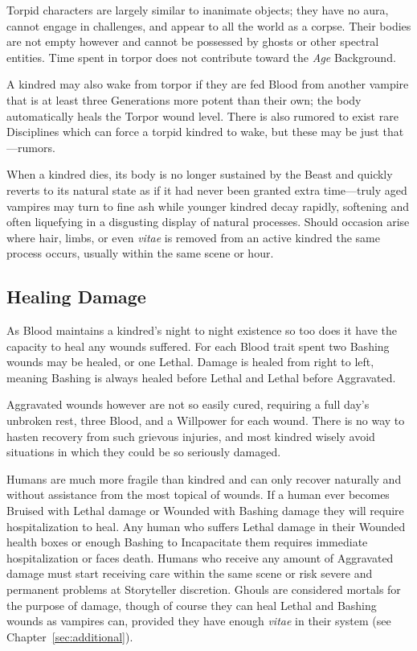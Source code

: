 Torpid characters are largely similar to inanimate objects; they have no aura, 
cannot engage in challenges, and appear to all the world as a corpse.  Their bodies 
are not empty however and cannot be possessed by ghosts or other spectral entities.  
Time spent in torpor does not contribute toward the \emph{Age} Background.

A kindred may also wake from torpor if they are fed Blood from another 
vampire that is at least three Generations more potent than their own; 
the body automatically heals the Torpor wound level.  There is also 
rumored to exist rare Disciplines which can force a torpid kindred to 
wake, but these may be just that---rumors.

When a kindred dies, its body is no longer sustained by the Beast and 
quickly reverts to its natural state as if it had never been granted 
extra time---truly aged vampires may turn to fine ash while younger 
kindred decay rapidly, softening and often liquefying in a disgusting 
display of natural processes.  Should occasion arise where hair, limbs, 
or even \emph{vitae} is removed from an active kindred the same process 
occurs, usually within the same scene or hour.

\subsection{Healing Damage}
As Blood maintains a kindred's night to night existence so too does it 
have the capacity to heal any wounds suffered.  For each Blood trait 
spent two Bashing wounds may be healed, or one Lethal.  Damage is healed 
from right to left, meaning Bashing is always healed before Lethal and 
Lethal before Aggravated.

Aggravated wounds however are not so easily cured, requiring a full 
day's unbroken rest, three Blood, and a Willpower for each wound.  
There is no way to hasten recovery from such grievous injuries, and most 
kindred wisely avoid situations in which they could be so seriously 
damaged.

Humans are much more fragile than kindred and can only recover naturally and 
without assistance from the most topical of wounds.  If a human ever becomes 
Bruised with Lethal damage or Wounded with Bashing damage they will require 
hospitalization to heal.  Any human who suffers Lethal damage in their 
Wounded health boxes or enough Bashing to Incapacitate them requires immediate 
hospitalization or faces death.  Humans who receive any amount of Aggravated damage 
must start receiving care within the same scene or risk severe and permanent problems 
at Storyteller discretion.  Ghouls are considered mortals for the purpose of damage, 
though of course they can heal Lethal and Bashing wounds as vampires can, provided 
they have enough \emph{vitae} in their system (see Chapter~\ref{sec:additional}).

